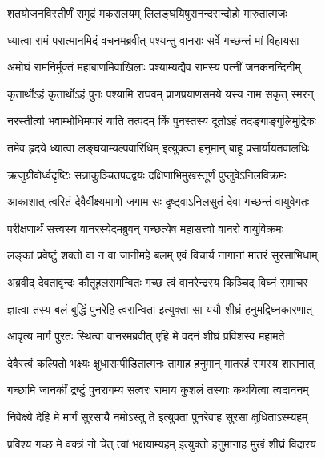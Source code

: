 





\twolineshloka
{शतयोजनविस्तीर्णं समुद्रं मकरालयम्}
{लिलङ्घयिषुरानन्दसन्दोहो मारुतात्मजः} %

\twolineshloka
{ध्यात्वा रामं परात्मानमिदं वचनमब्रवीत्}
{पश्यन्तु वानराः सर्वे गच्छन्तं मां विहायसा} %

\twolineshloka
{अमोघं रामनिर्मुक्तं महाबाणमिवाखिलाः}
{पश्याम्यद्यैव रामस्य पत्नीं जनकनन्दिनीम्} %

\twolineshloka
{कृतार्थोऽहं कृतार्थोऽहं पुनः पश्यामि राघवम्}
{प्राणप्रयाणसमये यस्य नाम सकृत् स्मरन्} %

\twolineshloka
{नरस्तीर्त्वा भवाम्भोधिमपारं याति तत्पदम्}
{किं पुनस्तस्य दूतोऽहं तदङ्गाङ्गुलिमुद्रिकः} %

\twolineshloka
{तमेव हृदये ध्यात्वा लङ्घयाम्यल्पवारिधिम्}
{इत्युक्त्वा हनुमान् बाहू प्रसार्यायतवालधिः} %

\twolineshloka
{ऋजुग्रीवोर्ध्वदृष्टिः सन्नाकुञ्चितपदद्वयः}
{दक्षिणाभिमुखस्तूर्णं पुप्लुवेऽनिलविक्रमः} %

\twolineshloka
{आकाशात् त्वरितं देवैर्वीक्ष्यमाणो जगाम सः}
{दृष्ट्वाऽनिलसुतं देवा गच्छन्तं वायुवेगतः} %

\twolineshloka
{परीक्षणार्थं सत्त्वस्य वानरस्येदमब्रुवन्}
{गच्छत्येष महासत्त्वो वानरो वायुविक्रमः} %

\twolineshloka
{लङ्कां प्रवेष्टुं शक्तो वा न वा जानीमहे बलम्}
{एवं विचार्य नागानां मातरं सुरसाभिधाम्} %

\twolineshloka
{अब्रवीद् देवतावृन्दः कौतूहलसमन्वितः}
{गच्छ त्वं वानरेन्द्रस्य किञ्चिद् विघ्नं समाचर} %

\twolineshloka
{ज्ञात्वा तस्य बलं बुद्धिं पुनरेहि त्वरान्विता}
{इत्युक्ता सा ययौ शीघ्रं हनुमद्विघ्नकारणात्} %

\twolineshloka
{आवृत्य मार्गं पुरतः स्थित्वा वानरमब्रवीत्}
{एहि मे वदनं शीघ्रं प्रविशस्व महामते} %

\twolineshloka
{देवैस्त्वं कल्पितो भक्ष्यः क्षुधासम्पीडितात्मनः}
{तामाह हनुमान् मातरहं रामस्य शासनात्} %

\twolineshloka
{गच्छामि जानकीं द्रष्टुं पुनरागम्य सत्वरः}
{रामाय कुशलं तस्याः कथयित्वा त्वदाननम्} %

\twolineshloka
{निवेक्ष्ये देहि मे मार्गं सुरसायै नमोऽस्तु ते}
{इत्युक्ता पुनरेवाह सुरसा क्षुधिताऽस्म्यहम्} %

\twolineshloka
{प्रविश्य गच्छ मे वक्त्रं नो चेत् त्वां भक्षयाम्यहम्}
{इत्युक्तो हनुमानाह मुखं शीघ्रं विदारय} %

